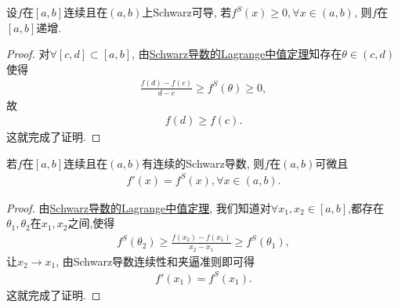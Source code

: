 \documentclass[../../main.tex]{subfiles}%
\begin{document}
\begin{proposition}
设$f$在$[a,b]$连续且在$(a,b)$上Schwarz可导, 若$f^S(x) \geqslant  0, \forall x \in (a,b)$, 则$f$在$[a,b]$递增.
\end{proposition}
\begin{proof}

对$\forall [c,d] \subset [a,b]$, 由\hyperref[theorem:Schwarz导数的Lagrange中值定理]{Schwarz导数的Lagrange中值定理}知存在$\theta \in (c,d)$使得
\begin{align*}
\frac{f(d) - f(c)}{d - c} \geqslant f^S(\theta) \geqslant 0,
\end{align*}
故
\begin{align*}
f(d) \geqslant f(c).
\end{align*}
这就完成了证明.
\end{proof}

\begin{proposition}
若$f$在$[a,b]$连续且在$(a,b)$有连续的Schwarz导数, 则$f$在$(a,b)$可微且
\begin{align*}
f'(x) = f^S(x), \forall x \in (a,b).
\end{align*}
\end{proposition}
\begin{proof}

由\hyperref[theorem:Schwarz导数的Lagrange中值定理]{Schwarz导数的Lagrange中值定理}, 我们知道对$\forall x_1,x_2\in [a,b]$,都存在$\theta_1,\theta_2$在$x_1,x_2$之间,使得
\begin{align*}
f^S(\theta_2) \geqslant \frac{f(x_2) - f(x_1)}{x_2 - x_1} \geqslant f^S(\theta_1),
\end{align*}
让$x_2 \to x_1$, 由Schwarz导数连续性和夹逼准则即可得
\begin{align*}
f'(x_1) = f^S(x_1).
\end{align*}
这就完成了证明.

\end{proof}
\end{document}

